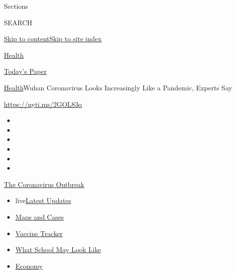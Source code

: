 Sections

SEARCH

\protect\hyperlink{site-content}{Skip to
content}\protect\hyperlink{site-index}{Skip to site index}

\href{https://www.nytimes.com/section/health}{Health}

\href{https://myaccount.nytimes.com/auth/login?response_type=cookie\&client_id=vi}{}

\href{https://www.nytimes.com/section/todayspaper}{Today's Paper}

\href{/section/health}{Health}\textbar{}Wuhan Coronavirus Looks
Increasingly Like a Pandemic, Experts Say

\url{https://nyti.ms/2GOL83q}

\begin{itemize}
\item
\item
\item
\item
\item
\item
\end{itemize}

\href{https://www.nytimes.com/news-event/coronavirus?action=click\&pgtype=Article\&state=default\&region=TOP_BANNER\&context=storylines_menu}{The
Coronavirus Outbreak}

\begin{itemize}
\tightlist
\item
  live\href{https://www.nytimes.com/2020/08/01/world/coronavirus-covid-19.html?action=click\&pgtype=Article\&state=default\&region=TOP_BANNER\&context=storylines_menu}{Latest
  Updates}
\item
  \href{https://www.nytimes.com/interactive/2020/us/coronavirus-us-cases.html?action=click\&pgtype=Article\&state=default\&region=TOP_BANNER\&context=storylines_menu}{Maps
  and Cases}
\item
  \href{https://www.nytimes.com/interactive/2020/science/coronavirus-vaccine-tracker.html?action=click\&pgtype=Article\&state=default\&region=TOP_BANNER\&context=storylines_menu}{Vaccine
  Tracker}
\item
  \href{https://www.nytimes.com/interactive/2020/07/29/us/schools-reopening-coronavirus.html?action=click\&pgtype=Article\&state=default\&region=TOP_BANNER\&context=storylines_menu}{What
  School May Look Like}
\item
  \href{https://www.nytimes.com/live/2020/07/31/business/stock-market-today-coronavirus?action=click\&pgtype=Article\&state=default\&region=TOP_BANNER\&context=storylines_menu}{Economy}
\end{itemize}

